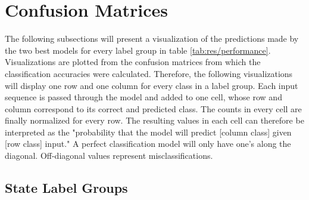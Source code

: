 \section{Confusion Matrices} \label{sec:res/confusion}

The following subsections will present a visualization of the predictions made by the two best models for every label group in table \ref{tab:res/performance}. Visualizations are plotted from the confusion matrices from which the classification accuracies were calculated. Therefore, the following visualizations will display one row and one column for every class in a label group. Each input sequence is passed through the model and added to one cell, whose row and column correspond to its correct and predicted class. The counts in every cell are finally normalized for every row. The resulting values in each cell can therefore be interpreted as the "probability that the model will predict [column class] given [row class] input." A perfect classification model will only have one's along the diagonal. Off-diagonal values represent misclassifications.

\newpage
\subsection{State Label Groups}

